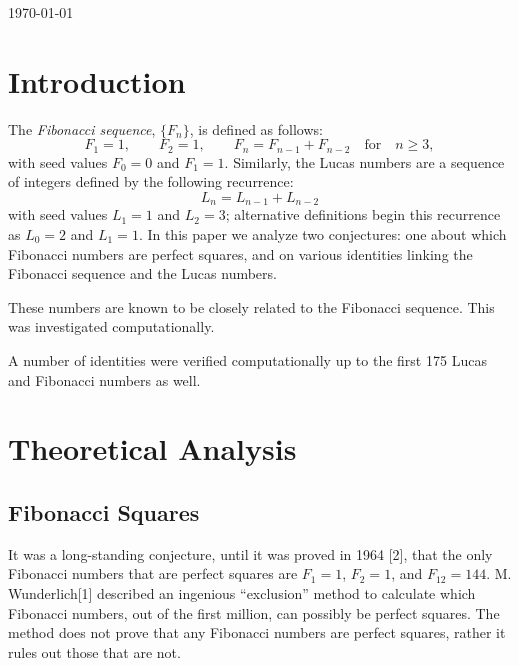 \documentclass[11pt]{article}
\begin{document}
\begin{titlepage}
{\large \today}\\[3cm] 


 

\vfill 

\end{titlepage}

\tableofcontents
\newpage
\newpage

\section{Introduction}

The \textit{Fibonacci sequence}, $\{F_n\}$, is defined as follows: \[ F_1 = 1, \qquad F_2 = 1, \qquad F_n = F_{n - 1} + F_{n - 2} \quad \text{for} \quad n \geq 3, \] with seed values $F_{0} = 0$ and $F_{1} = 1$. Similarly, the Lucas numbers are a sequence of integers defined by the following recurrence: \[ L_{n} = L_{n-1} + L_{n-2}\] with seed values $L_{1} = 1$ and $L_{2} = 3$; alternative definitions begin this recurrence as $L_{0} = 2$ and $L_{1} = 1$. In this paper we analyze two conjectures: one about which Fibonacci numbers are perfect squares, and on various identities linking the Fibonacci sequence and the Lucas numbers.

These numbers are known to be closely related to the Fibonacci sequence. This was investigated computationally.

A number of identities were verified computationally up to the first 175 Lucas and Fibonacci numbers as well.


\section{Theoretical Analysis}
\subsection{Fibonacci Squares}
It was a long-standing conjecture, until it was proved in 1964 [2], that the only Fibonacci numbers that are perfect squares are $F_1 = 1$, $F_2 = 1$, and $F_{12} = 144$. M. Wunderlich[1] described an ingenious ``exclusion'' method to calculate which Fibonacci numbers, out of the first million, can possibly be perfect squares. The method does not prove that any Fibonacci numbers are perfect squares, rather it rules out those that are not.
\end{document}
